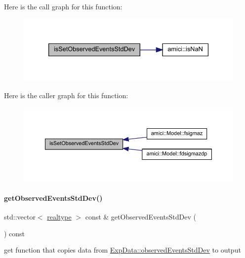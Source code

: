 Here is the call graph for this function\+:
\nopagebreak
\begin{figure}[H]
\begin{center}
\leavevmode
\includegraphics[width=333pt]{classamici_1_1_exp_data_a29530529cf50b9fa791e02fed620ea7a_cgraph}
\end{center}
\end{figure}
Here is the caller graph for this function\+:
\nopagebreak
\begin{figure}[H]
\begin{center}
\leavevmode
\includegraphics[width=350pt]{classamici_1_1_exp_data_a29530529cf50b9fa791e02fed620ea7a_icgraph}
\end{center}
\end{figure}
\mbox{\label{classamici_1_1_exp_data_a18cd150b527e08a9dd4a02b242a76d46}} 
\paragraph{\texorpdfstring{get\+Observed\+Events\+Std\+Dev()}{getObservedEventsStdDev()}}
{\footnotesize\ttfamily std\+::vector$<$ \mbox{\hyperlink{namespaceamici_a1bdce28051d6a53868f7ccbf5f2c14a3}{realtype}} $>$ const  \& get\+Observed\+Events\+Std\+Dev (\begin{DoxyParamCaption}{ }\end{DoxyParamCaption}) const}

get function that copies data from \mbox{\hyperlink{classamici_1_1_exp_data_abb12a8f75b4e6c936ae6c0be770628c9}{Exp\+Data\+::observed\+Events\+Std\+Dev}} to output

